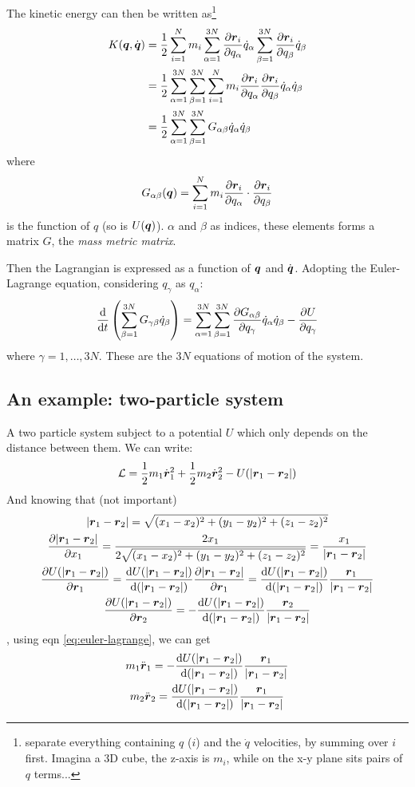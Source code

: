 The kinetic energy can then be written as\footnote{separate everything containing $q$ ($i$) and the $\dot{q}$ velocities, by summing over $i$ first. Imagina a 3D cube, the z-axis is $m_i$, while on the x-y plane sits pairs of $q$ terms...}
\begin{align}\label{eq:kinetic-energy}
	K(\vq,\dvq)&=\half\sumin m_i\suman\p{\vr_i}{q_\alpha}\dot{q}_\alpha\sum_{\beta=1}^{3N}\p{\vr_i}{q_\beta}\dot{q}_\beta \notag\\
	&=\half\suman\sum_{\beta=1}^{3N}\sumin m_i\p{\vr_i}{q_\alpha}\p{\vr_i}{q_\beta}\dot{q}_\alpha\dot{q}_\beta \notag\\
	&=\half\suman\sum_{\beta=1}^{3N}G_{\alpha\beta}\dot{q}_\alpha\dot{q}_\beta
\end{align}
where
\begin{equation}
	G_{\alpha\beta}(\vq)=\sumin m_i\p{\vr_i}{q_\alpha}\cdot\p{\vr_i}{q_\beta}
\end{equation}
is the function of $q$ (so is $U(\vq)$). $\alpha$ and $\beta$ as indices, these elements forms a matrix $G$, the \textit{mass metric matrix}. 

Then the Lagrangian is expressed as a function of $\vq$ and $\dvq$. Adopting the Euler-Lagrange equation, considering $q_{\gamma}$ as $q_\alpha$:
\begin{equation}
	\der{}{t}\left(\sum_{\beta=1}^{3N}G_{\gamma\beta}\dot{q}_\beta\right)=\suman\sum_{\beta=1}^{3N}\p{G_{\alpha\beta}}{q_\gamma}\dot{q}_\alpha\dot{q}_\beta-\p{U}{q_\gamma} \label{eq:lag-equations}
\end{equation}
where $\gamma=1,\dots,3N$. These are the $3N$ equations of motion of the system.

\subsection{An example: two-particle system}
A two particle system subject to a potential $U$ which only depends on the distance between them. We can write:
\begin{equation}
	\lag=\half m_1\dvr_1^2+\half m_2\dvr_2^2-U(|\vr_1-\vr_2|) \label{eq:ex1.4}\\
\end{equation}
And knowing that (not important)
\begin{gather*}
	|\vr_1-\vr_2|=\sqrt{(x_1-x_2)^2+(y_1-y_2)^2+(z_1-z_2)^2}\\
	\p{|\vr_1-\vr_2|}{x_1}=\dfrac{2x_1}{2\sqrt{(x_1-x_2)^2+(y_1-y_2)^2+(z_1-z_2)^2}}=\dfrac{x_1}{|\vr_1-\vr_2|}\\
	\p{U(|\vr_1-\vr_2|)}{\vr_1}=\der{U(|\vr_1-\vr_2|)}{(|\vr_1-\vr_2|)}\p{|\vr_1-\vr_2|}{\vr_1}=\der{U(|\vr_1-\vr_2|)}{(|\vr_1-\vr_2|)}\dfrac{\vr_1}{|\vr_1-\vr_2|}\\
	\p{U(|\vr_1-\vr_2|)}{\vr_2}=-\der{U(|\vr_1-\vr_2|)}{(|\vr_1-\vr_2|)}\dfrac{\vr_2}{|\vr_1-\vr_2|}
\end{gather*}
, using eqn \ref{eq:euler-lagrange}, we can get
\begin{gather*}
	m_1\ddvr_1=-\der{U(|\vr_1-\vr_2|)}{(|\vr_1-\vr_2|)}\dfrac{\vr_1}{|\vr_1-\vr_2|}\\
	m_2\ddvr_2=\der{U(|\vr_1-\vr_2|)}{(|\vr_1-\vr_2|)}\dfrac{\vr_1}{|\vr_1-\vr_2|}
\end{gather*}

